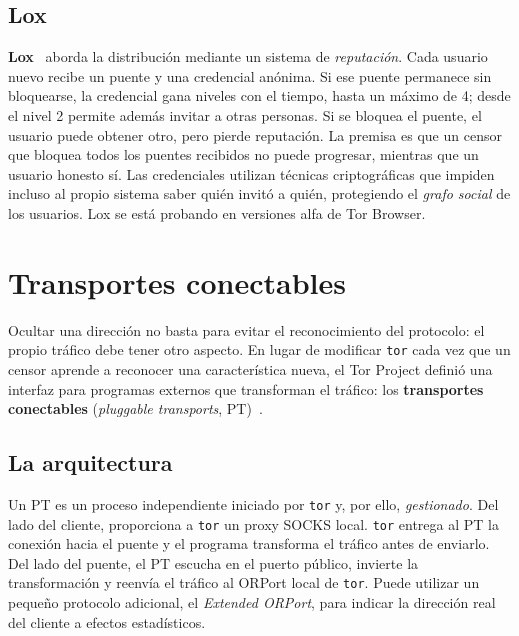 \subsection{Lox}

\textbf{Lox}~\cite{tulloch2023lox} aborda la distribución mediante un sistema de \emph{reputación}. Cada usuario nuevo recibe un puente y una credencial anónima. Si ese puente permanece sin bloquearse, la credencial gana niveles con el tiempo, hasta un máximo de 4; desde el nivel 2 permite además invitar a otras personas. Si se bloquea el puente, el usuario puede obtener otro, pero pierde reputación. La premisa es que un censor que bloquea todos los puentes recibidos no puede progresar, mientras que un usuario honesto sí. Las credenciales utilizan técnicas criptográficas que impiden incluso al propio sistema saber quién invitó a quién, protegiendo el \emph{grafo social} de los usuarios. Lox se está probando en versiones alfa de Tor Browser.

\section{Transportes conectables}\label{sec:cens-pt}

Ocultar una dirección no basta para evitar el reconocimiento del protocolo: el propio tráfico debe tener otro aspecto. En lugar de modificar \texttt{tor} cada vez que un censor aprende a reconocer una característica nueva, el Tor Project definió una interfaz para programas externos que transforman el tráfico: los \textbf{transportes conectables} (\emph{pluggable transports}, PT)~.

\subsection{La arquitectura}

Un PT es un proceso independiente iniciado por \texttt{tor} y, por ello, \emph{gestionado}. Del lado del cliente, proporciona a \texttt{tor} un proxy SOCKS local. \texttt{tor} entrega al PT la conexión hacia el puente y el programa transforma el tráfico antes de enviarlo. Del lado del puente, el PT escucha en el puerto público, invierte la transformación y reenvía el tráfico al ORPort local de \texttt{tor}. Puede utilizar un pequeño protocolo adicional, el \emph{Extended ORPort}, para indicar la dirección real del cliente a efectos estadísticos.

